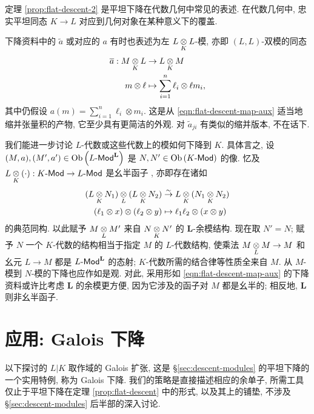 定理 \ref{prop:flat-descent-2} 是平坦下降在代数几何中常见的表述. 在代数几何中, 忠实平坦同态 $K \to L$ 对应到几何对象在某种意义下的覆盖.

下降资料中的 $\tilde{a}$ 或对应的 $a$ 有时也表述为左 $L \underset{K}{\otimes} L$-模, 亦即 $(L, L)$-双模的同态
\begin{align*}
	\overline{a}: M \underset{K}{\otimes} L & \to L \underset{K}{\otimes} M \\
	m \otimes \ell & \mapsto \sum_{i=1}^n \ell_i \otimes \ell m_i ,
\end{align*}
其中仍假设 $a(m) = \sum_{i=1}^n \ell_i \otimes m_i$. 这是从 \eqref{eqn:flat-descent-map-aux} 适当地缩并张量积的产物, 它至少具有更简洁的外观. 对 $\tilde{a}_{ji}$ 有类似的缩并版本, 不在话下.

\begin{remark}[代数和模的平坦下降]\label{rem:flat-descent-alg}
	我们能进一步讨论 $L$-代数或这些代数上的模如何下降到 $K$. 具体言之, 设 $(M, a), (M', a') \in \operatorname{Ob}\left(L\text{-}\mathsf{Mod}^{\mathbf{L}}\right)$ 是 $N, N' \in \operatorname{Ob}\left(K\text{-}\mathsf{Mod}\right)$ 的像. 忆及 $L \underset{K}{\otimes} (\cdot): K\text{-}\mathsf{Mod} \to L\text{-}\mathsf{Mod}$ 是幺半函子 \cite[命题 6.6.10]{Li1}, 亦即存在诸如
	\begin{equation}\label{eqn:change-of-ring-monoidal}\begin{aligned}
			(L \underset{K}{\otimes} N_1) \underset{L}{\otimes} (L \underset{K}{\otimes} N_2) & \stackrel{\sim}{\rightarrow} L \underset{K}{\otimes} (N_1 \underset{K}{\otimes} N_2) \\
			(\ell_1 \otimes x) \otimes (\ell_2 \otimes y) & \mapsto \ell_1 \ell_2 \otimes (x \otimes y)
	\end{aligned}\end{equation}
	的典范同构. 以此赋予 $M \underset{L}{\otimes} M'$ 来自 $N \underset{K}{\otimes} N'$ 的 $\mathbf{L}$-余模结构. 现在取 $N' = N$; 赋予 $N$ 一个 $K$-代数的结构相当于指定 $M$ 的 $L$-代数结构, 使乘法 $M \underset{L}{\otimes} M \to M$ 和幺元 $L \to M$ 都是 $L\text{-}\mathsf{Mod}^{\mathbf{L}}$ 的态射; $K$-代数所需的结合律等性质全来自 $M$. 从 $M$-模到 $N$-模的下降也应作如是观. 对此, 采用形如 \eqref{eqn:flat-descent-map-aux} 的下降资料或许比考虑 $\mathbf{L}$ 的余模更方便, 因为它涉及的函子对 $M$ 都是幺半的; 相反地, $\mathbf{L}$ 则非幺半函子.
\end{remark}

\section{应用: Galois 下降}\label{sec:descent-Galois}
以下探讨的 $L|K$ 取作域的 Galois 扩张, 这是 \S\ref{sec:descent-modules} 的平坦下降的一个实用特例, 称为 Galois 下降. 我们的策略是直接描述相应的余单子, 所需工具仅止于平坦下降在定理 \ref{prop:flat-descent} 中的形式, 以及其上的铺垫, 不涉及 \S\ref{sec:descent-modules} 后半部的深入讨论.

